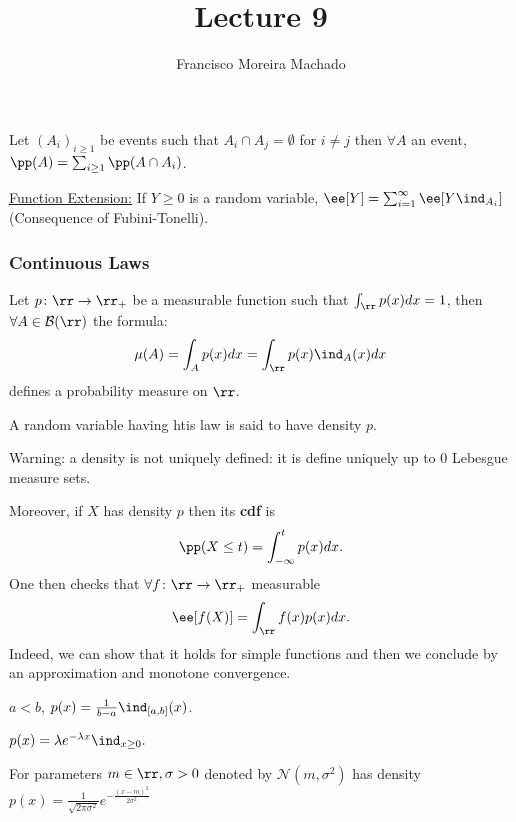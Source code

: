\documentclass[../main.tex]{subfiles}
\author{Francisco Moreira Machado}
\title{Lecture 9}
\begin{document}
\begin{remark} 
  Let $(A_i)_{i \geq 1}$ be events such that $A_i \cap A_j = \emptyset$ for $i \neq j$ 
  then $\forall A$ an event, $\pp(A) = \sum_{i \geq 1} \pp(A \cap A_i)$.

  \vspace{0.2em}
  \noindent
  \underline{\sffamily Function Extension:} If $Y \geq 0$ is a random variable,
  $\ee[Y]=\sum_{i = 1}^\infty \ee[Y \ind_{A_i}]$ (Consequence of Fubini-Tonelli).
\end{remark}

\subsubsection{Continuous Laws}

\begin{definition}
  Let $p \colon \rr \to \rr_+$ be a measurable function such that $\int_\rr p(x)dx = 1$,
  then $\forall A \in \mathcal{B}(\rr)$ the formula:
  \[
    \mu(A) = \int_{A} p(x) dx = \int_{\rr} p(x) \ind_{A}(x)dx
  \]
  defines a probability measure on $\rr$.

  \vspace{0.3em}
  A random variable having htis law is said to have density $p$.
\end{definition}

{\color{red} Warning:} a density is not uniquely defined: it is define uniquely up to $0$ 
Lebesgue measure sets.

Moreover, if $X$ has density $p$ then its \textbf{cdf} is
\[
  \pp(X \leq t) = \int_{-\infty}^t p(x)dx
.\] 
One then checks that $\forall f \colon \rr \to \rr_+$ measurable
\[
  \ee[f(X)] = \int_{\rr} f(x)p(x)dx
.\]
Indeed, we can show that it holds for simple functions and then we conclude by an
approximation and monotone convergence.

\begin{definition}
    $a < b$, $p(x) = \frac{1}{b - a} \ind_{[a, b]}(x)$.
\end{definition}    
\begin{definition}
  $p(x) = \lambda e^{-\lambda x} \ind_{x \geq 0}.$
\end{definition}
\begin{definition}
  For parameters $m \in \rr, \sigma > 0$ denoted by  $\mathcal{N}(m, \sigma^2)$
  has density $p(x) = \frac{1}{\sqrt{2\pi \sigma^2}} e^{-\frac{(x-m)^2}{2\sigma^2} }$
\end{definition}
\end{document}
